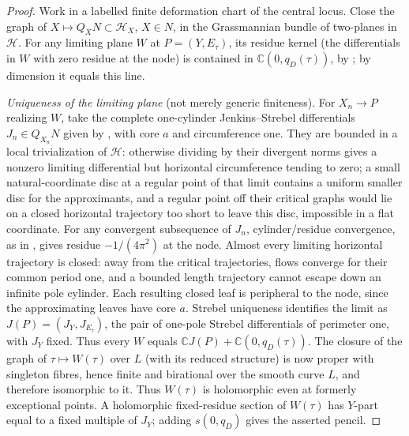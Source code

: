 \documentclass[12pt]{article}
\theoremstyle{remark}
\begin{document}
\begin{proof}
Work in a labelled finite deformation chart of the central
locus. Close the graph of \(X\mapsto Q_XN\subset\mathcal H_X\),
\(X\in N\), in the Grassmannian bundle of two-planes in
\(\mathcal H\). For any limiting plane \(W\) at \(P=(Y,E_\tau)\),
its residue kernel (the differentials in \(W\) with zero residue at
the node) is contained in \(\mathbb C(0,q_D(\tau))\), by
\cite[Corollaries 3.11--3.12 and the proof of Theorem 3.9]{AHW};
by dimension it equals this line.

\emph{Uniqueness of the limiting plane} (not merely generic
finiteness). For \(X_n\to P\) realizing \(W\), take the complete
one-cylinder
Jenkins--Strebel differentials \(J_n\in Q_{X_n}N\)
given by \cite[Corollary 2.7]{AHW}, with core \(a\)
and circumference one.
They are bounded in a local trivialization of \(\mathcal H\):
otherwise dividing by their divergent norms gives a nonzero
limiting differential but horizontal circumference tending
to zero; a small natural-coordinate disc at a regular
point of that limit contains a uniform smaller disc for
the approximants, and a regular point off their critical graphs
would lie on a closed horizontal trajectory too short
to leave this disc, impossible in a flat coordinate.
For any convergent subsequence of \(J_n\), cylinder/residue
convergence, as in \cite[Lemma 3.10]{AHW}, gives residue
\(-1/(4\pi^2)\) at the node. Almost every limiting horizontal
trajectory is closed: away from the critical trajectories,
flows converge for their common period one, and a bounded
length trajectory cannot escape down an infinite pole cylinder.
Each resulting closed leaf is peripheral to the node, since
the approximating leaves have core \(a\).
Strebel uniqueness \cite[Theorem 2]{Zvonkine} identifies the
limit as \(J(P)=(J_Y,J_{E_\tau})\),
the pair of one-pole Strebel differentials of perimeter one,
with \(J_Y\) fixed. Thus every \(W\) equals
\(\mathbb C J(P)+\mathbb C(0,q_D(\tau))\).
The closure of the graph of \(\tau\mapsto W(\tau)\) over \(L\)
(with its reduced structure) is now proper with singleton
fibres, hence finite and birational over the smooth curve
\(L\), and therefore isomorphic to it. Thus \(W(\tau)\) is
holomorphic even at formerly exceptional points.
A holomorphic fixed-residue section of \(W(\tau)\) has
\(Y\)-part equal to a fixed multiple of \(J_Y\); adding
\(s(0,q_D)\) gives the asserted pencil.


\end{proof}
\end{document}
